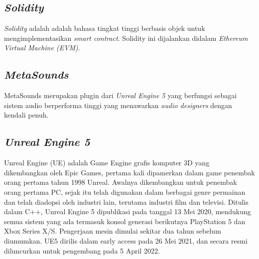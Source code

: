 \subsection{\emph{Solidity}}
\emph{Solidity} adalah adalah bahasa tingkat tinggi berbasis objek untuk mengimplementasikan
\emph{smart contract}. Solidity ini dijalankan didalam \emph{Ethereum Virtual Machine (EVM)}.

\subsection{\emph{MetaSounds}}
MetaSounds merupakan plugin dari \emph{Unreal Engine 5} yang berfungsi sebagai sistem audio
berperforma tinggi yang menawarkan \emph{audio designers} dengan kendali penuh.

\subsection{\emph{Unreal Engine 5}}

Unreal Engine (UE) adalah Game Engine grafis komputer 3D yang dikembangkan oleh Epic Games, pertama kali dipamerkan dalam game penembak orang pertama tahun 1998 Unreal.
Awalnya dikembangkan untuk penembak orang pertama PC, sejak itu telah digunakan dalam berbagai genre permainan dan telah diadopsi oleh industri lain, terutama industri film dan televisi. Ditulis dalam C++,
Unreal Engine 5 dipublikasi pada tanggal 13 Mei 2020, mendukung semua sistem yang ada termasuk konsol generasi berikutnya PlayStation 5 dan Xbox Series X/S.\parencite{StattEpicAnnounce} Pengerjaan mesin dimulai sekitar dua
tahun sebelum diumumkan.\parencite{DeanTakahashi} UE5 dirilis dalam early access pada 26 Mei 2021,\parencite{EddieMakuch} dan secara resmi diluncurkan untuk pengembang pada 5 April 2022.\parencite{UE5Launch}

